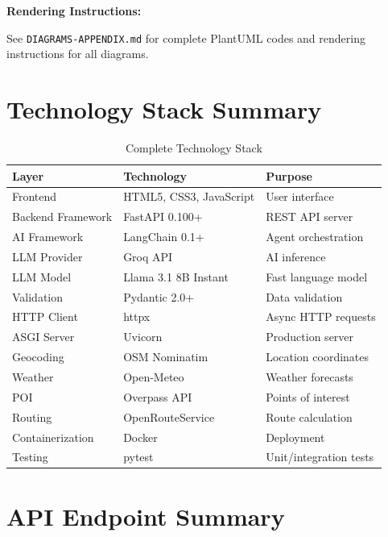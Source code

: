 \documentclass[12pt,a4paper]{report}
\begin{document}
\textbf{Rendering Instructions:}

See \texttt{DIAGRAMS-APPENDIX.md} for complete PlantUML codes and rendering instructions for all diagrams.

\section{Technology Stack Summary}

\begin{table}[H]
\centering
\small
\begin{tabular}{|l|l|p{6cm}|}
\hline
\textbf{Layer} & \textbf{Technology} & \textbf{Purpose} \\
\hline
Frontend & HTML5, CSS3, JavaScript & User interface \\
\hline
Backend Framework & FastAPI 0.100+ & REST API server \\
\hline
AI Framework & LangChain 0.1+ & Agent orchestration \\
\hline
LLM Provider & Groq API & AI inference \\
\hline
LLM Model & Llama 3.1 8B Instant & Fast language model \\
\hline
Validation & Pydantic 2.0+ & Data validation \\
\hline
HTTP Client & httpx & Async HTTP requests \\
\hline
ASGI Server & Uvicorn & Production server \\
\hline
Geocoding & OSM Nominatim & Location coordinates \\
\hline
Weather & Open-Meteo & Weather forecasts \\
\hline
POI & Overpass API & Points of interest \\
\hline
Routing & OpenRouteService & Route calculation \\
\hline
Containerization & Docker & Deployment \\
\hline
Testing & pytest & Unit/integration tests \\
\hline
\end{tabular}
\caption{Complete Technology Stack}
\label{tab:tech-stack}
\end{table}

\section{API Endpoint Summary}
\end{document}
